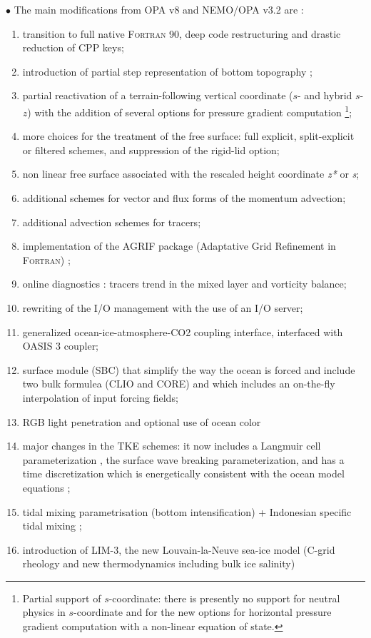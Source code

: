 \documentclass[../tex_main/NEMO_manual]{subfiles}
\begin{document}
$\bullet$ The main modifications from OPA v8 and NEMO/OPA v3.2 are :\\
\begin{enumerate}
\item
  transition to full native \textsc{Fortran} 90, deep code restructuring and drastic reduction of CPP keys; 
\item
  introduction of partial step representation of bottom topography
  \citep{Barnier_al_OD06, Le_Sommer_al_OM09, Penduff_al_OS07};
\item
  partial reactivation of a terrain-following vertical coordinate ($s$- and hybrid $s$-$z$) with
  the addition of several options for pressure gradient computation
  \footnote{Partial support of $s$-coordinate: there is presently no support for neutral physics in
    $s$-coordinate and for the new options for horizontal pressure gradient computation with
    a non-linear equation of state.
  };
\item
  more choices for the treatment of the free surface: full explicit, split-explicit or filtered schemes,
  and suppression of the rigid-lid option;
\item
  non linear free surface associated with the rescaled height coordinate \textit{z*} or \textit{s};
\item
  additional schemes for vector and flux forms of the momentum advection;
\item
  additional advection schemes for tracers;
\item
  implementation of the AGRIF package (Adaptative Grid Refinement in \textsc{Fortran}) \citep{Debreu_al_CG2008};
\item
  online diagnostics : tracers trend in the mixed layer and vorticity balance;
\item
  rewriting of the I/O management with the use of an I/O server;
\item
  generalized ocean-ice-atmosphere-CO2 coupling interface, interfaced with OASIS 3 coupler;
\item
  surface module (SBC) that simplify the way the ocean is forced and include two bulk formulea (CLIO and CORE) and
  which includes an on-the-fly interpolation of input forcing fields;
\item
  RGB light penetration and optional use of ocean color 
\item
  major changes in the TKE schemes: it now includes a Langmuir cell parameterization \citep{Axell_JGR02},
  the \citet{Mellor_Blumberg_JPO04} surface wave breaking parameterization, and has a time discretization which
  is energetically consistent with the ocean model equations \citep{Burchard_OM02, Marsaleix_al_OM08};
\item
  tidal mixing parametrisation (bottom intensification) + Indonesian specific tidal mixing
  \citep{Koch-Larrouy_al_GRL07};
\item
  introduction of LIM-3, the new Louvain-la-Neuve sea-ice model
  (C-grid rheology and new thermodynamics including bulk ice salinity)
  \citep{Vancoppenolle_al_OM09a, Vancoppenolle_al_OM09b}
\end{enumerate}
\end{document}
